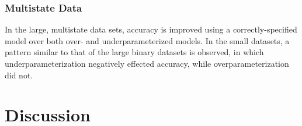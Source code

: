 \documentclass[]{article}
\begin{document}
\subsubsection{Multistate Data}

In the large, multistate data sets, accuracy is improved using a correctly-specified model over both over- and underparameterized models. 
In the small datasets, a pattern similar to that of the large binary datasets is observed, in which underparameterization negatively effected accuracy, while overparameterization did not. \par

\section{Discussion}	
\end{document}
